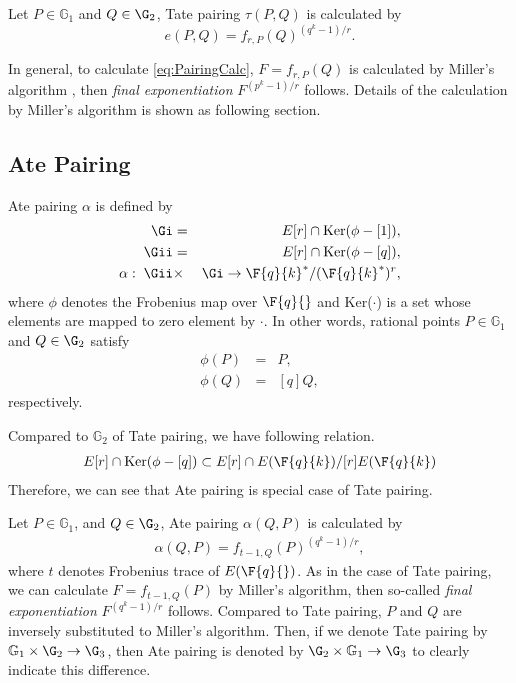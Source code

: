 Let $P\in\mathbb{G}_1$ and $Q\in\G_2$, Tate pairing $\tau(P,Q)$ is calculated by
\begin{equation}
e(P,Q) = f_{r,P}(Q)^{(q^{k}-1)/r}. \label{eq:PairingCalc}
\end{equation}

In general, to calculate \eqref{eq:PairingCalc}, $F=f_{r,P}(Q)$ is calculated by Miller's algorithm \cite{Handbook}, then {\it final exponentiation} $F^{(p^k-1)/r}$ follows.
Details of the calculation by Miller's algorithm is shown as following section. 

\subsection{Ate Pairing}
Ate pairing $\alpha$ \cite{Hess} is defined by
\begin{eqnarray}
\Gi &=& E[r]\cap {\rm Ker}(\phi-[1]), \nonumber \\
\Gii &=& E[r]\cap {\rm Ker}(\phi-[q]), \nonumber \\
\alpha :\;\Gii &\times& \Gi \rightarrow \F{q}{k} ^*/(\F{q}{k} ^*)^r, \label{eq:AteDef}
\end{eqnarray}
where $\phi$ denotes the Frobenius map over $\F{q}{}$ and Ker($\cdot $) is a set whose elements are mapped to zero element by $\cdot $.
In other words, rational points $P\in\mathbb{G}_1$ and $Q\in\G_2$ satisfy 
\begin{eqnarray}
\phi(P) &=& P, \\
\phi(Q) &=& [q]Q,
\end{eqnarray}
respectively.  

Compared to $\mathbb{G}_2$ of Tate pairing, we have following relation.
\begin{eqnarray}
E[r]\cap {\rm Ker}(\phi-[q]) \subset E[r]\cap E(\F{q}{k})/[r]E(\F{q}{k})
\end{eqnarray}
Therefore, we can see that Ate pairing is special case of Tate pairing. 

Let $P\in\mathbb{G}_1$, and $Q\in\G_2$, Ate pairing $\alpha(Q,P)$ is calculated by
\begin{eqnarray}
\alpha(Q,P) = f_{t-1,Q}(P)^{(q^{k}-1)/r}, \label{eq:AteCalc}
\end{eqnarray}
where $t$ denotes Frobenius trace of $E(\F{q}{})$.
As in the case of Tate pairing, we can calculate $F=f_{t-1,Q}(P)$ by Miller's algorithm, then so-called {\it final exponentiation} $F^{(q^{k}-1)/r}$ follows.
Compared to Tate pairing, $P$ and $Q$ are inversely substituted to Miller's algorithm.
Then, if we denote Tate pairing by $\mathbb{G}_1 \times \G_2 \rightarrow \G_3$, then Ate pairing is denoted  by $\G_2 \times \mathbb{G}_1 \rightarrow \G_3$ to clearly indicate this difference. 

